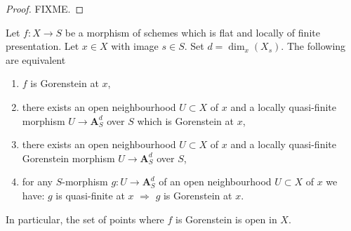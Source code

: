 \begin{proof}
FIXME.
\end{proof}

\begin{lemma}
\label{lemma-flat-finite-presentation-characterize-gorenstein}
Let $f : X \to S$ be a morphism of schemes which is flat and locally
of finite presentation. Let $x \in X$ with image $s \in S$.
Set $d = \dim_x(X_s)$. The following are equivalent
\begin{enumerate}
\item $f$ is Gorenstein at $x$,
\item there exists an open neighbourhood $U \subset X$ of $x$
and a locally quasi-finite morphism $U \to \mathbf{A}^d_S$ over $S$
which is Gorenstein at $x$,
\item there exists an open neighbourhood $U \subset X$ of $x$
and a locally quasi-finite Gorenstein morphism $U \to \mathbf{A}^d_S$ over $S$,
\item for any $S$-morphism $g : U \to \mathbf{A}^d_S$
of an open neighbourhood $U \subset X$ of $x$ we have:
$g$ is quasi-finite at $x$ $\Rightarrow$ $g$ is Gorenstein at $x$.
\end{enumerate}
In particular, the set of points where $f$ is Gorenstein is
open in $X$.
\end{lemma}

